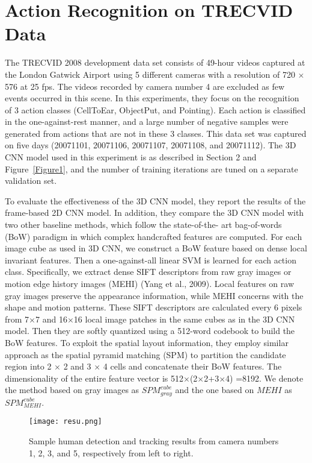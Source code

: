 \documentclass[10pt,twocolumn,letterpaper]{article}
\begin{document}
\section{Action Recognition on TRECVID Data}
The TRECVID 2008 development data set consists of 49-hour videos captured at the London Gatwick Airport using 5 different cameras with a resolution of
720 $\times$ 576 at 25 fps. The videos recorded by camera number 4 are excluded as few events occurred in this scene. In this experiments, they focus on the recognition of 3 action classes (CellToEar, ObjectPut, and Pointing). Each action is classified in the one-against-rest manner, and a large number of negative samples were generated from actions that are not in these 3 classes. This data set was captured on five days (20071101,
20071106, 20071107, 20071108, and 20071112). The 3D CNN model used in
this experiment is as described in Section 2 and Figure~\ref{Figure1}, and the number of training iterations are tuned on a separate validation set.
\par To evaluate the effectiveness of the 3D CNN model, they report the results of the frame-based 2D CNN model. In addition, they compare the 3D CNN model with two other baseline methods, which follow the state-of-the-
art bag-of-words (BoW) paradigm in which complex handcrafted features are computed. For each image cube as used in 3D CNN, we construct a BoW feature
based on dense local invariant features. Then a one-against-all linear SVM is learned for each action class. Specifically, we extract dense SIFT descriptors from raw gray images or motion edge history images (MEHI) (Yang et al., 2009). Local features on raw gray images preserve the appearance information, while MEHI concerns with the shape and motion patterns. These SIFT descriptors are calculated every 6 pixels from 7$\times$7 and 16$\times$16 local image patches in the same cubes as in the 3D CNN model. Then they are softly quantized using a 512-word codebook to build
the BoW features. To exploit the spatial layout information, they employ similar approach as the spatial pyramid matching (SPM) to partition the candidate region into 2 $\times$ 2 and 3 $\times$ 4 cells and concatenate their BoW features. The dimensionality of the entire feature vector is 512$\times$(2$\times$2+3$\times$4) =8192. We denote the method based on gray images as $SPM^{cube}_{gray}$ and the one based on $MEHI$ as $SPM_{MEHI}^{cube}$.
  \begin{figure}[!htb]
  	\centering
  	\texttt{[image: resu.png]}\\
  	\caption{Sample human detection and tracking results from camera numbers 1, 2, 3, and 5, respectively from left to right.}\label{Figure2} 
  \end{figure}
\end{document}
